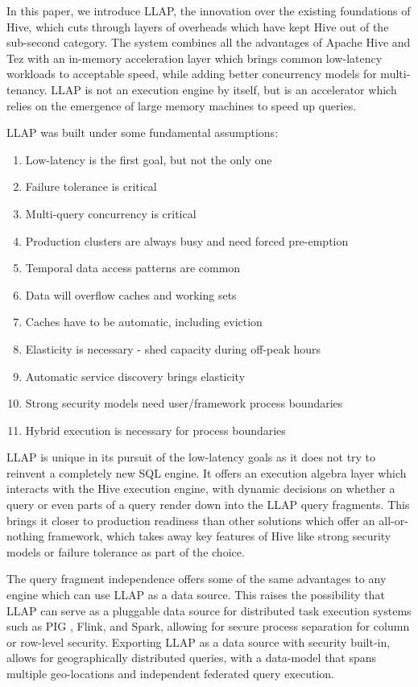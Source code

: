 In this paper, we introduce LLAP, the innovation over the existing foundations of Hive, which cuts through layers of overheads which have kept Hive out of the sub-second category. The system combines all the advantages of Apache Hive and Tez with an in-memory acceleration layer which brings common low-latency workloads to acceptable speed, while adding better concurrency models for multi-tenancy. LLAP is not an execution engine by itself, but is an accelerator which relies on the emergence of large memory machines to speed up queries.

LLAP was built under some fundamental assumptions:
\begin{enumerate}
\item Low-latency is the first goal, but not the only one
\item Failure tolerance is critical 
\item Multi-query concurrency is critical 
\item Production clusters are always busy and need forced pre-emption
\item Temporal data access patterns are common
\item Data will overflow caches and working sets 
\item Caches have to be automatic, including eviction 
\item Elasticity is necessary - shed capacity during off-peak hours
\item Automatic service discovery brings elasticity 
\item Strong security models need user/framework process boundaries 
\item Hybrid execution is necessary for process boundaries
\end{enumerate}

LLAP is unique in its pursuit of the low-latency goals as it does not try to reinvent a completely new SQL engine. It offers an execution algebra layer which interacts with the Hive execution engine, 
with dynamic decisions on whether a query or even parts of a query render down into the LLAP query fragments. This brings it closer to production readiness than other solutions which offer an 
all-or-nothing framework, which takes away key features of Hive like strong security models or failure tolerance as part of the choice.

The query fragment independence offers some of the same advantages to any engine which can use LLAP as a data source. This raises the possibility that LLAP can serve as a pluggable data source for 
distributed task execution systems such as PIG \cite{pig}, Flink\cite{flink}, and Spark\cite{spark}, allowing for secure process separation for column or row-level security. Exporting LLAP as a data 
source with security built-in, allows for geographically distributed queries, with a data-model that spans multiple geo-locations and independent federated query execution.

